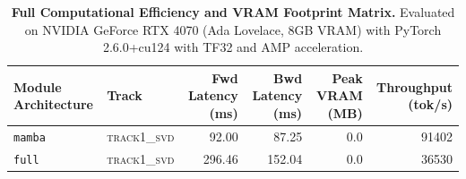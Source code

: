 \begin{table}[t]
\centering
\small
\caption{\textbf{Full Computational Efficiency and VRAM Footprint Matrix.} Evaluated on NVIDIA GeForce RTX 4070 (Ada Lovelace, 8GB VRAM) with PyTorch 2.6.0+cu124 with TF32 and AMP acceleration.}
\label{tab:efficiency_benchmark_results}
\begin{tabular}{l l r r r r}
\toprule
\textbf{Module Architecture} & \textbf{Track} & \textbf{Fwd Latency (ms)} & \textbf{Bwd Latency (ms)} & \textbf{Peak VRAM (MB)} & \textbf{Throughput (tok/s)} \\
\midrule
\texttt{mamba} & \textsc{track1\_svd} & 92.00 & 87.25 & 0.0 & 91402 \\
\texttt{full} & \textsc{track1\_svd} & 296.46 & 152.04 & 0.0 & 36530 \\
\bottomrule
\end{tabular}
\end{table}